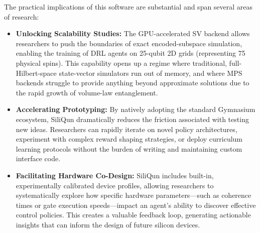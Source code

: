 \documentclass[preprint,12pt, a4paper]{elsarticle}
\begin{document}
\begin{table}[htbp]
\centering
\caption{Comparison of SiliQun with existing quantum simulation frameworks. Checkmarks indicate native support; ``Manual'' indicates the feature is achievable but requires significant user effort.}
\label{tab:comparison}
\end{table}

The practical implications of this software are substantial and span several areas of research:
\begin{itemize}
    \item \textbf{Unlocking Scalability Studies:} The GPU-accelerated SV backend allows researchers to push the boundaries of exact encoded-subspace simulation, enabling the training of DRL agents on 25-qubit 2D grids (representing 75 physical spins). This capability opens up a regime where traditional, full-Hilbert-space state-vector simulators run out of memory, and where MPS backends struggle to provide anything beyond approximate solutions due to the rapid growth of volume-law entanglement.
    \item \textbf{Accelerating Prototyping:} By natively adopting the standard Gymnasium ecosystem, SiliQun dramatically reduces the friction associated with testing new ideas. Researchers can rapidly iterate on novel policy architectures, experiment with complex reward shaping strategies, or deploy curriculum learning protocols without the burden of writing and maintaining custom interface code.
    \item \textbf{Facilitating Hardware Co-Design:} SiliQun includes built-in, experimentally calibrated device profiles, allowing researchers to systematically explore how specific hardware parameters---such as coherence times or gate execution speeds---impact an agent's ability to discover effective control policies. This creates a valuable feedback loop, generating actionable insights that can inform the design of future silicon devices.
\end{itemize}
\end{document}
